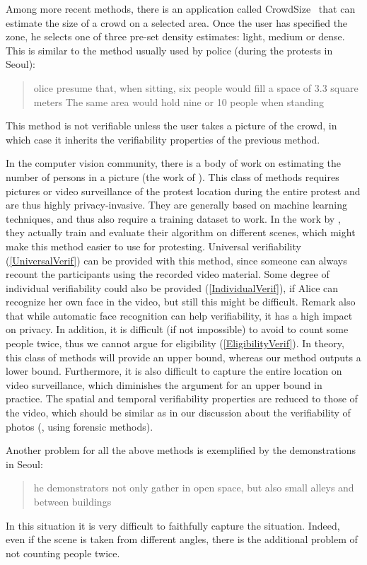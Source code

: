 Among more recent methods, there is an application called CrowdSize~\cite{CrowdSize} that can estimate the size of a crowd on a selected area.
Once the user has specified the zone, he selects one of three pre-set density estimates: light, medium or dense.
This is similar to the method usually used by police (\eg during the protests in Seoul):
\blockcquote{2016DemonstrationsInSeoul}{%
  olice presume that, when sitting, six people would fill a space of 
  3.3 square meters
  \textelp{}
  The same area would hold nine or 10 people when standing%
}.
This method is not verifiable unless the user takes a picture of the crowd, in which case it inherits the verifiability properties of the previous method.

In the computer vision community, there is a body of work on estimating the number of persons in a picture (\eg the work of 
\citet{NNCrowdCounting}).
This class of methods requires pictures or video surveillance of the protest location during the entire protest and are thus highly privacy-invasive.
They are generally based on machine learning techniques, and thus also require a training dataset to work.
In the work by \cite{NNCrowdCounting}, they actually train and evaluate their algorithm on different scenes, which might make this method easier to use for protesting.
Universal verifiability (\cref{UniversalVerif}) can be provided with this method, since someone can always recount the participants using the recorded video material.
Some degree of individual verifiability could also be provided (\cref{IndividualVerif}), if Alice can recognize her own face in the video, but still this might be difficult. 
Remark also that while automatic face recognition can help verifiability, it has a high impact on privacy.
In addition, it is difficult (if not impossible) to avoid to count some people twice, thus we cannot argue for eligibility (\cref{EligibilityVerif}).
In theory, this class of methods will provide an upper bound, whereas our method outputs a lower bound.
Furthermore, it is also difficult to capture the entire location on video surveillance, which diminishes the argument for an upper bound in practice.
The spatial and temporal verifiability properties are reduced to those of the video, which should be similar as in our discussion about the verifiability of photos (\ie, using forensic methods).

Another problem for all the above methods is exemplified by the demonstrations in Seoul:
\blockcquote{2016DemonstrationsInSeoul}{%
  he demonstrators not only gather in open space, but also small alleys and between buildings%
}.
In this situation it is very difficult to faithfully capture the situation.
Indeed, even if the scene is taken from different angles, there is the additional problem of not counting people twice.

